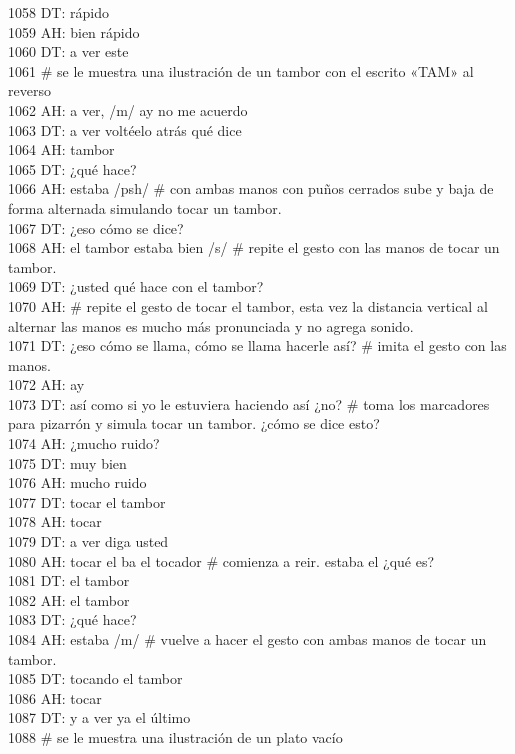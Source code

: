 1058 DT: rápido\\
1059 AH: bien rápido\\
1060 DT: a ver este\\
1061 # se le muestra una ilustración de un tambor con el escrito «TAM» al reverso\\
1062 AH: a ver, /m/ ay no me acuerdo\\
1063 DT: a ver voltéelo atrás qué dice\\
1064 AH: tambor\\
1065 DT: ¿qué hace?\\
1066 AH: estaba /psh/ # con ambas manos con puños cerrados sube y baja de forma alternada simulando tocar un tambor. \\
1067 DT: ¿eso cómo se dice?\\
1068 AH: el tambor estaba bien /s/ # repite el gesto con las manos de tocar un tambor.\\
1069 DT: ¿usted qué hace con el tambor?\\
1070 AH: # repite el gesto de tocar el tambor, esta vez la distancia vertical al alternar las manos es mucho más pronunciada y no agrega sonido.\\
1071 DT: ¿eso cómo se llama, cómo se llama hacerle así? # imita el gesto con las manos.\\
1072 AH: ay\\
1073 DT: así como si yo le estuviera haciendo así ¿no? # toma los marcadores para pizarrón y simula tocar un tambor. ¿cómo se dice esto?\\
1074 AH: ¿mucho ruido?\\
1075 DT: muy bien\\
1076 AH: mucho ruido\\
1077 DT: tocar el tambor\\
1078 AH: tocar\\
1079 DT: a ver diga usted\\
1080 AH: tocar el ba el tocador # comienza a reir. estaba el ¿qué es?\\
1081 DT: el tambor\\
1082 AH: el tambor\\
1083 DT: ¿qué hace?\\
1084 AH: estaba /m/ # vuelve a hacer el gesto con ambas manos de tocar un tambor.\\
1085 DT: tocando el tambor\\
1086 AH: tocar\\
1087 DT: y a ver ya el último\\
1088 # se le muestra una ilustración de un plato vacío\\
